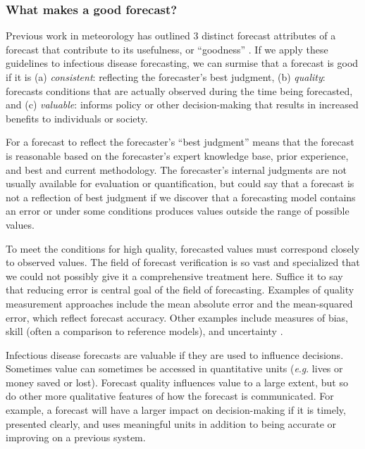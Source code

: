 \documentclass[a4paper]{article}
\newcommand{\eg}{\textit{e}.\textit{g}. }
\begin{document}
\subsubsection*{What makes a good forecast?}

Previous work in meteorology has outlined 3 distinct forecast attributes of a forecast that contribute to its usefulness, or ``goodness'' \cite{Murphy1993}.
If we apply these guidelines to infectious disease forecasting, we can surmise that a forecast is good if it is (a) \textit{consistent}: reflecting the forecaster's best judgment, (b) \textit{quality}: forecasts conditions that are actually observed during the time being forecasted, and (c) \textit{valuable}: informs policy or other decision-making that results in increased benefits to individuals or society.  

For a forecast to reflect the forecaster's ``best judgment'' means that the forecast is reasonable based on the forecaster's expert knowledge base, prior experience, and best and current methodology.
The forecaster's internal judgments are not usually available for evaluation or quantification, but could say that a forecast is not a reflection of best judgment if we discover that a forecasting model contains an error or under some conditions produces values outside the range of possible values.

To meet the conditions for high quality, forecasted values must correspond closely to observed values.
The field of forecast verification is so vast and specialized that we could not possibly give it a comprehensive treatment here.
Suffice it to say that reducing error is central goal of the field of forecasting.
Examples of quality measurement approaches include the mean absolute error and the mean-squared error, which reflect forecast accuracy.
Other examples include measures of bias, skill (often a comparison to reference models), and uncertainty \cite{Jolliffe2003}.

Infectious disease forecasts are valuable if they are used to influence decisions.
Sometimes value can sometimes be accessed in quantitative units (\eg lives or money saved or lost).
Forecast quality influences value to a large extent, but so do other more qualitative features of how the forecast is communicated.
For example, a forecast will have a larger impact on decision-making if it is timely, presented clearly, and uses meaningful units in addition to being accurate or improving on a previous system.

\end{document}
